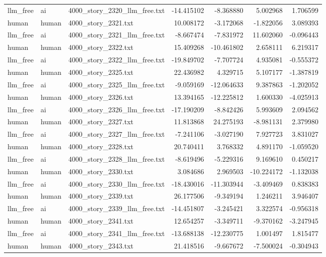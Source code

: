 \begin{longtable}{lllrrrr}
llm\_free & ai & 4000\_story\_2320\_llm\_free.txt & -14.415102 & -8.368880 & 5.002968 & 1.706599 \\
human & human & 4000\_story\_2321.txt & 10.008172 & -3.172068 & -1.822056 & 3.089393 \\
llm\_free & ai & 4000\_story\_2321\_llm\_free.txt & -8.667474 & -7.831972 & 11.602060 & -0.096443 \\
human & human & 4000\_story\_2322.txt & 15.409268 & -10.461802 & 2.658111 & 6.219317 \\
llm\_free & ai & 4000\_story\_2322\_llm\_free.txt & -19.849702 & -7.707724 & 4.935081 & -0.555372 \\
human & human & 4000\_story\_2325.txt & 22.436982 & 4.329715 & 5.107177 & -1.387819 \\
llm\_free & ai & 4000\_story\_2325\_llm\_free.txt & -9.059169 & -12.064633 & 9.387863 & -1.202052 \\
human & human & 4000\_story\_2326.txt & 13.394165 & -12.225812 & 1.600330 & -4.025913 \\
llm\_free & ai & 4000\_story\_2326\_llm\_free.txt & -17.190209 & -8.842426 & 5.993609 & 2.094562 \\
human & human & 4000\_story\_2327.txt & 11.813868 & 24.275193 & -8.981131 & 2.379980 \\
llm\_free & ai & 4000\_story\_2327\_llm\_free.txt & -7.241106 & -3.027190 & 7.927723 & 3.831027 \\
human & human & 4000\_story\_2328.txt & 20.740411 & 3.768332 & 4.891170 & -1.059520 \\
llm\_free & ai & 4000\_story\_2328\_llm\_free.txt & -8.619496 & -5.229316 & 9.169610 & 0.450217 \\
human & human & 4000\_story\_2330.txt & 3.084686 & 2.969503 & -10.224172 & -1.132038 \\
llm\_free & ai & 4000\_story\_2330\_llm\_free.txt & -18.430016 & -11.303944 & -3.409469 & 0.838383 \\
human & human & 4000\_story\_2339.txt & 26.177506 & -9.349194 & 1.246211 & 3.946407 \\
llm\_free & ai & 4000\_story\_2339\_llm\_free.txt & -14.451807 & -3.245421 & 3.322574 & -0.956318 \\
human & human & 4000\_story\_2341.txt & 12.654257 & -3.349711 & -9.370162 & -3.247945 \\
llm\_free & ai & 4000\_story\_2341\_llm\_free.txt & -13.688138 & -12.230775 & 1.001497 & 1.815477 \\
human & human & 4000\_story\_2343.txt & 21.418516 & -9.667672 & -7.500024 & -0.304943 \\

\end{longtable}
